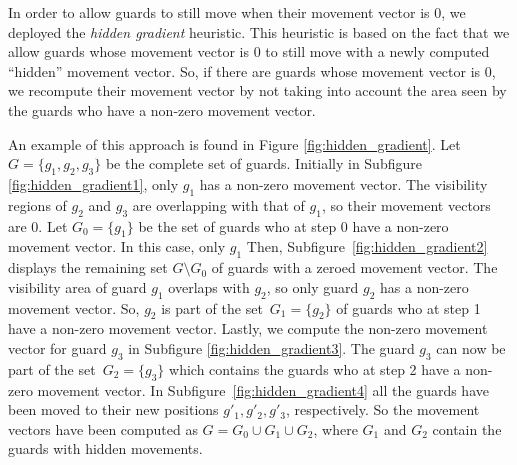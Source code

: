 In order to allow guards to still move when their movement vector is 0, we deployed the \textit{hidden gradient} heuristic. This heuristic is based on the fact that we allow guards whose movement vector is 0 to still move with a newly computed ``hidden'' movement vector. So, if there are guards whose movement vector is 0, we  recompute their movement vector by not taking into account the area seen by the guards who have a non-zero movement vector.

An example of this approach is found in Figure \ref{fig:hidden_gradient}. Let $G = \{g_1, g_2, g_3\}$ be the complete set of guards. Initially in Subfigure \ref{fig:hidden_gradient1}, only $g_1$ has a non-zero movement vector. The visibility regions of $g_2$ and $g_3$ are overlapping with that of $g_1$, so their movement vectors are 0. Let $G_0 = \{g_1\}$ be the set of guards who at step 0 have a non-zero movement vector. In this case, only $g_1$
Then, Subfigure~\ref{fig:hidden_gradient2} displays the remaining set $G \setminus G_0$ of guards with a zeroed movement vector. The visibility area of guard $g_1$ overlaps with $g_2$, so only guard $g_2$ has a non-zero movement vector. So, $g_2$ is part of the set~$G_1 = \{g_2\}$ of guards who at step 1 have a non-zero movement vector.
Lastly, we  compute the non-zero movement vector for guard $g_3$ in Subfigure \ref{fig:hidden_gradient3}. The guard $g_3$ can now be part of the set~$G_2 = \{g_3\}$ which contains the guards who at step 2 have a non-zero movement vector.
In Subfigure~\ref{fig:hidden_gradient4} all the guards have been moved to their new positions $g'_1, g'_2, g'_3$, respectively. So the movement vectors have been computed as $G = G_0 \cup G_1 \cup G_2$, where $G_1$ and $G_2$ contain the guards with hidden movements.

